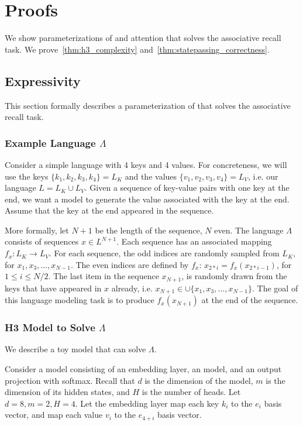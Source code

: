 \section{Proofs}
\label{sec:proofs}

We show parameterizations of \hthree and attention that solves the associative recall task.
We prove~\cref{thm:h3_complexity} and~\cref{thm:statepassing_correctness}.

\subsection{\hthree Expressivity}
\label{sec:app_expressivity}

This section formally describes a parameterization of \hthree that solves the associative recall task.

\subsubsection{Example Language $\Lambda$}
Consider a simple language with 4 keys and 4 values.
For concreteness, we will use the keys $\{k_1, k_2, k_3, k_4\} = L_K$ and the values $\{v_1, v_2, v_3, v_4\} = L_V$, i.e. our language $L = L_K \cup L_V$.
Given a sequence of key-value pairs with one key at the end, we want a model to generate the value associated with the key at the end.
Assume that the key at the end appeared in the sequence.

More formally, let $N+1$ be the length of the sequence, $N$ even.
The language $\Lambda$ consists of sequences $x \in L^{N+1}$.
Each sequence has an associated mapping $f_x : L_K \rightarrow L_V$.
For each sequence, the odd indices are randomly sampled from $L_K$, for $x_1, x_3, \dots, x_{N-1}$.
The even indices are defined by $f_x$: $x_{2*i} = f_x(x_{2*i-1})$, for $1 \leq i \leq N / 2$.
The last item in the sequence $x_{N+1}$, is randomly drawn from the keys that have appeared in $x$ already, i.e. $x_{N+1} \in \cup{\{x_1, x_3, \dots, x_{N-1}\}}$.
The goal of this language modeling task is to produce $f_x(x_{N+1})$ at the end of the sequence.

\subsubsection{H3 Model to Solve $\Lambda$}
We describe a toy \hthree model that can solve $\Lambda$.

Consider a model consisting of an embedding layer, an \hthree model, and an output projection with softmax.
Recall that $d$ is the dimension of the \hthree model, $m$ is the dimension of its hidden states, and $H$ is the number of heads.
Let $d = 8, m = 2, H = 4$.
Let the embedding layer map each key $k_i$ to the $e_i$ basis vector, and map each value $v_i$ to the $e_{4+i}$ basis vector.

